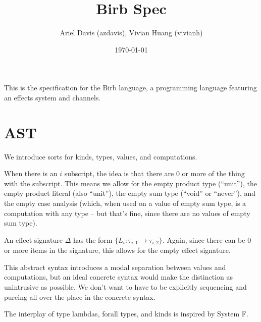 \documentclass[12pt]{article}
\title{Birb Spec}
\author{Ariel Davis (azdavis), Vivian Huang (vivianh)}
\date{\today}
\begin{document}
\maketitle

This is the specification for the Birb language, a programming language
featuring an effects system and channels.

\newpage
\section{AST}

We introduce sorts for kinds, types, values, and computations.

When there is an $i$ subscript, the idea is that there are 0 or more of the
thing with the subscript. This means we allow for the empty product type
(``unit''), the empty product literal (also ``unit''), the empty sum type
(``void'' or ``never''), and the empty case analysis (which, when used on a
value of empty sum type, is a computation with any type -- but that's fine,
since there are no values of empty sum type).

An effect signature $\Delta$ has the form $\{ L_i : \tau_{i,1} \rightarrow
\tau_{i,2} \}$. Again, since there can be 0 or more items in the signature, this
allows for the empty effect signature.

This abstract syntax introduces a modal separation between values and
computations, but an ideal concrete syntax would make the distinction as
unintrusive as possible. We don't want to have to be explicitly sequencing and
\textsf{pure}ing all over the place in the concrete syntax.

The interplay of type lambdas, forall types, and kinds is inspired by System F.
\end{document}

